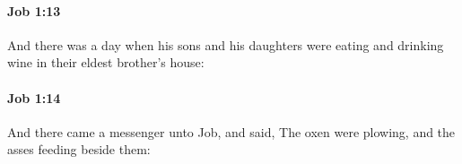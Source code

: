 		\paragraph{Job 1:13} %
			\label{JOB-1-13}

			And there was a day when his sons and his daughters were eating and drinking wine in their eldest brother’s house:


		\paragraph{Job 1:14} %
			\label{JOB-1-14}

			And there came a messenger unto Job, and said, The oxen were plowing, and the asses feeding beside them:


